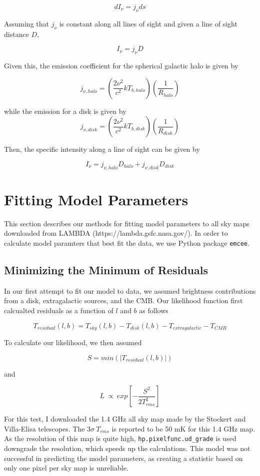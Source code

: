 \documentclass[letterpaper, 10pt]{article}
\begin{document}
\[ dI_{\nu} = j_{\nu}ds  \]

Assuming that $j_{\nu}$ is constant along all lines of sight and given a line of sight distance $D$, 

\[ I_{\nu} = j_{\nu}D \]

Given this, the emission coefficient for the spherical galactic halo is given by 

\[j_{\nu, halo} = \left(\frac{2\nu^{2}}{c^{2}}kT_{b, halo}\right)\left(\frac{1}{R_{halo}}\right)\]

while the emission for a disk is given by 
\[j_{\nu, disk} = \left(\frac{2\nu^{2}}{c^{2}}kT_{b, disk}\right)\left(\frac{1}{R_{disk}}\right)\]

Then, the specific intensity along a line of sight can be given by 

\[I_{\nu} = j_{\nu, halo}D_{halo} + j_{\nu, disk}D_{disk} \]

\section{Fitting Model Parameters}
This section describes our methods for fitting model parameters to all sky maps downloaded from LAMBDA (https://lambda.gsfc.nasa.gov/). In order to calculate model paramters that best fit the data, we use Python package \texttt{emcee}. 

\subsection{Minimizing the Minimum of Residuals}
In our first attempt to fit our model to data, we assumed brightness contributions from a disk, extragalactic sources, and the CMB. Our likelihood function first calcualted residuals as a function of $l$ and $b$ as follows

\[ T_{residual}(l,b) = T_{sky}(l,b) - T_{disk}(l,b) - T_{extragalactic} - T_{CMB} \]

To calculate our likelihood, we then assumed

\[ S = min\left(|T_{residual}(l,b)|\right) \] 

and 

\[ L\ \propto\ exp\left[-\frac{S^2}{2T_{rms}^2}\right] \]

For this test, I downloaded the 1.4 GHz all sky map made by the Stockert and Villa-Elisa telescopes. The $3\sigma\ T_{rms}$ is reported to be 50 mK for this 1.4 GHz map. As the resolution of this map is quite high, \texttt{hp.pixelfunc.ud\_grade} is used downgrade the resolution, which speeds up the calculations. This model was not successful in predicting the model parameters, as creating a statistic based on only one pixel per sky map is unreliable. 
\end{document}
